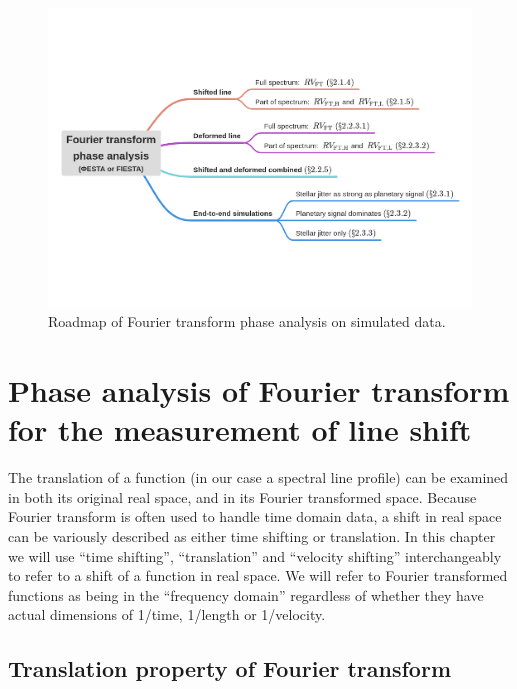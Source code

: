 \begin{figure}[hbp]
\centering
\includegraphics[width = 1.0 \linewidth]
{./Figures/Methods/Thinkmap.png}
\caption[Simulation map]
{Roadmap of Fourier transform phase analysis on simulated data.}
\label{fig:simulation_map}
\end{figure} 

\pagebreak

\section{Phase analysis of Fourier transform for the measurement of line shift}
\label{\thesection}
\label{ch:FT_line_shift}

The translation of a function (in our case a spectral line profile) can be examined in both its original real
space, and in its Fourier transformed space. Because Fourier transform is often used to handle time domain data,
a shift in real space can be variously described as either time shifting or translation. In this chapter 
we will use ``time shifting'', ``translation'' and ``velocity shifting'' interchangeably to refer to a shift of a function in real space. We will refer to Fourier transformed functions as being in the ``frequency domain'' regardless of whether they have actual dimensions of 1/time, 1/length or 1/velocity.

\subsection{Translation property of Fourier transform}

